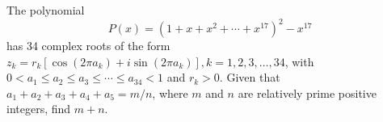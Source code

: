 The polynomial \[P(x)=(1+x+x^2+\cdots+x^{17})^2-x^{17}\]has 34 complex roots of the form $z_k=r_k[\cos(2\pi a_k)+i\sin(2\pi a_k)], k=1, 2, 3,\ldots, 34$, with $0<a_1\le a_2\le a_3\le\cdots\le a_{34}<1$ and $r_k>0$. Given that $a_1+a_2+a_3+a_4+a_5=m/n$, where $m$ and $n$ are relatively prime positive integers, find $m+n$.